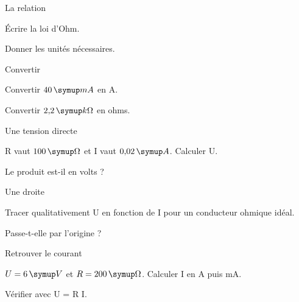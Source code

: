 \par\noindent\begin{minipage}{\linewidth}
\begin{exercice}[1]{La relation}
\begin{questions}
\item Écrire la loi d’Ohm.
\item Donner les unités nécessaires.
\end{questions}
\end{exercice}
\end{minipage}
\par\noindent\begin{minipage}{\linewidth}
\begin{exercice}[1]{Convertir}
\begin{questions}
\item Convertir $40\unite{mA}$ en A.
\item Convertir $2{,}2\unite{k\Omega}$ en ohms.
\end{questions}
\end{exercice}
\end{minipage}
\par\noindent\begin{minipage}{\linewidth}
\begin{exercice}[1]{Une tension directe}
\begin{questions}
\item R vaut $100\unite\Omega$ et I vaut $0{,}02\unite A$. Calculer U.
\item Le produit est-il en volts ?
\end{questions}
\end{exercice}
\end{minipage}
\par\noindent\begin{minipage}{\linewidth}
\begin{exercice}[1]{Une droite}
\begin{questions}
\item Tracer qualitativement U en fonction de I pour un conducteur ohmique idéal.
\item Passe-t-elle par l’origine ?
\end{questions}
\end{exercice}
\end{minipage}
\clearpage{}
\par\noindent\begin{minipage}{\linewidth}
\begin{exercice}[2]{Retrouver le courant}
\begin{questions}
\item $U=6\unite V$ et $R=200\unite\Omega$. Calculer I en A puis mA.
\item Vérifier avec U = R I.
\end{questions}
\end{exercice}
\end{minipage}
